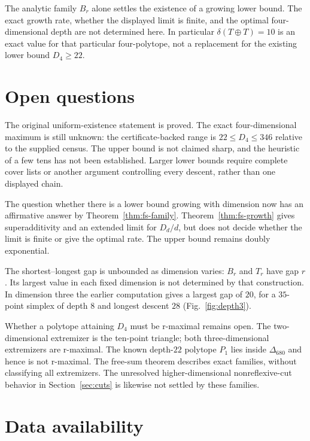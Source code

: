 \documentclass[manuscript]{aomart}
\theoremstyle{definition}
\theoremstyle{remark}
\newcommand{\Dbig}{\Delta_{680}}
\begin{document}
The analytic family $B_r$ alone settles the existence of a growing
lower bound. The exact growth rate, whether the displayed limit is finite,
and the optimal four-dimensional depth are not determined here.
In particular $\delta(T\oplus T)=10$ is an exact value for that particular
four-polytope, not a replacement for the existing lower bound $D_4\ge22$.

\section{Open questions}\label{sec:open}

The original uniform-existence statement is proved. The exact
four-dimensional maximum is still unknown: the certificate-backed
range is $22\le D_4\le346$ relative to the supplied census. The
upper bound is not claimed sharp, and the heuristic of a few tens
has not been established. Larger lower bounds require complete cover
lists or another argument controlling every descent, rather than one
displayed chain.

The question whether there is a lower bound growing with dimension
now has an affirmative answer by Theorem~\ref{thm:fs-family}.
Theorem~\ref{thm:fs-growth} gives superadditivity and an extended limit
for $D_d/d$, but does not decide whether the limit is finite or give
the optimal rate. The upper bound remains doubly exponential.

The shortest--longest gap is unbounded as dimension varies: $B_r$
and $T_r$ have gap $r$. Its largest value in each fixed dimension is
not determined by that construction. In dimension three the earlier
computation gives a largest gap of $20$, for a $35$-point simplex of
depth $8$ and longest descent $28$ (Fig.~\ref{fig:depth3}).

Whether a polytope attaining $D_4$ must be r-maximal remains open.
The two-dimensional extremizer is the ten-point triangle; both
three-dimensional extremizers are r-maximal. The known depth-$22$
polytope $P_1$ lies inside $\Dbig$ and hence is not r-maximal. The
free-sum theorem describes exact families, without classifying all
extremizers. The unresolved higher-dimensional nonreflexive-cut
behavior in Section~\ref{sec:cuts} is likewise not settled by these
families.

\section*{Data availability}
\end{document}
